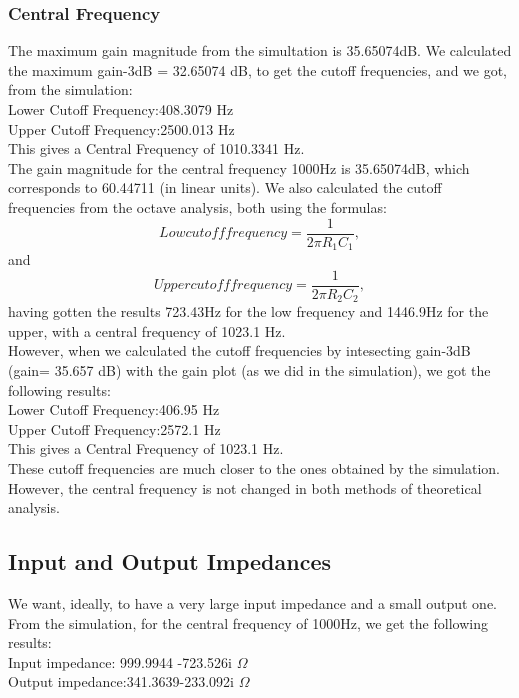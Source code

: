 \subsubsection{Central Frequency}
The maximum gain magnitude from the simultation is 35.65074dB.
We calculated the maximum gain-3dB = 32.65074 dB, to get the cutoff frequencies, and we got, from the simulation:\\
Lower Cutoff Frequency:408.3079 Hz\\
Upper Cutoff Frequency:2500.013 Hz\\
This gives a Central Frequency of 1010.3341 Hz.\\
The gain magnitude for the central frequency 1000Hz is 35.65074dB, which corresponds to 60.44711 (in linear units).
We also calculated the cutoff frequencies from the octave analysis, both using the formulas:
\begin{equation}
Low cutoff frequency=\frac{1}{2 \pi R_1 C_1},
\end{equation}
and
\begin{equation}
Upper cutoff frequency=\frac{1}{2 \pi R_2 C_2},
\end{equation}
having gotten the results 723.43Hz for the low frequency and 1446.9Hz for the upper, with a central frequency of 1023.1 Hz.\\
However, when we calculated the cutoff frequencies by intesecting  gain-3dB (gain= 35.657 dB) with the  gain plot (as we did in the simulation), we got the following results:\\
Lower Cutoff Frequency:406.95 Hz\\
Upper Cutoff Frequency:2572.1 Hz\\
This gives a Central Frequency of 1023.1 Hz.\\
These cutoff frequencies are much closer to the ones obtained by the simulation. However, the central frequency is not changed in both methods of theoretical analysis.


\subsection{Input and Output Impedances}
We want, ideally, to have a very large input impedance and a small output one.\\
From the simulation, for the central frequency of 1000Hz, we get the following results:\\
Input impedance: 999.9944 -723.526i $\Omega$\\
Output impedance:341.3639-233.092i $\Omega$\\
\\

